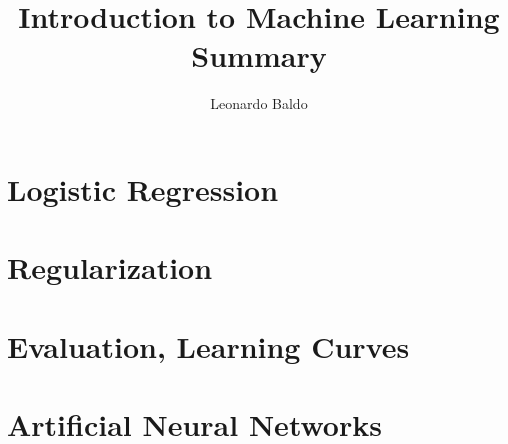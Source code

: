 \documentclass{article}
\title{Introduction to Machine Learning Summary}
\author{Leonardo Baldo}
\date{}
\begin{document}
\maketitle
\newpage

\tableofcontents
\newpage






\section{Logistic Regression}
\newpage

\section{Regularization}
\newpage

\section{Evaluation, Learning Curves}
\newpage

\section{Artificial Neural Networks}
\newpage
\end{document}
